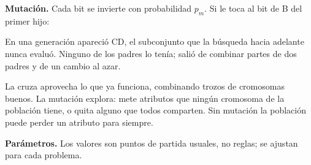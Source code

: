 \documentclass[11pt,letterpaper]{article}
\begin{document}
\begin{ejemplo}
    \textbf{Mutación.} Cada bit se invierte con probabilidad $p_m$. Si
    le toca al bit de B del primer hijo:
    \begin{center}
    \end{center}
    En una generación apareció CD, el subconjunto que la búsqueda hacia
    adelante nunca evaluó. Ninguno de los padres lo tenía; salió de
    combinar partes de dos padres y de un cambio al azar.
\end{ejemplo}

La cruza aprovecha lo que ya funciona, combinando trozos de
cromosomas buenos. La mutación explora: mete atributos que ningún
cromosoma de la población tiene, o quita alguno que todos comparten.
Sin mutación la población puede perder un atributo para siempre.

\textbf{Parámetros.} Los valores son puntos de partida usuales, no
reglas; se ajustan para cada problema.
\end{document}

